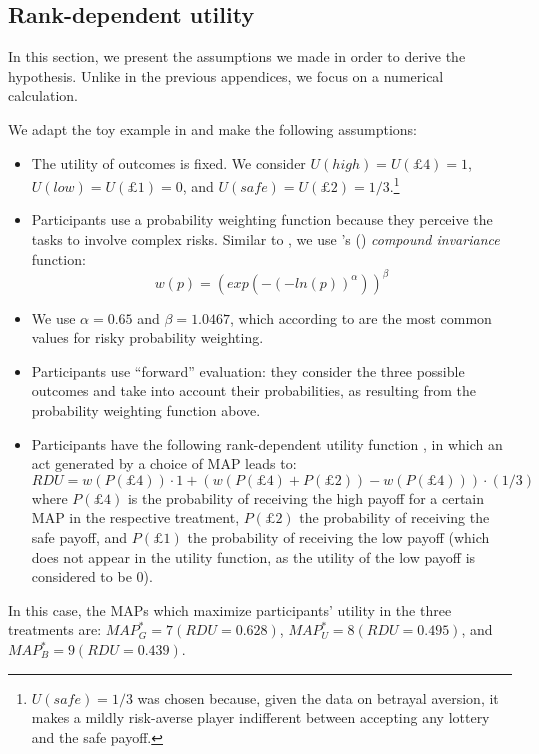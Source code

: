 \documentclass[pdftex,12pt, a4paper]{article}
\begin{document}
\subsection{Rank-dependent utility}
\label{subsec:RDU}

In this section, we present the assumptions we made in order to derive the hypothesis.
Unlike in the previous appendices, we focus on a numerical calculation.

We adapt the toy example in \cite{Li2020a} and make the following assumptions:
\begin{itemize}
\item The utility of outcomes is fixed. We consider $U(high) = U(\pounds4) = 1$, $U(low) = U(\pounds1) = 0$, and $U(safe) = U(\pounds2) = 1/3$.\footnote{
$U(safe)=1/3$ was chosen because, given the data on betrayal aversion, it makes a mildly risk-averse player indifferent between accepting any lottery and the safe payoff.
}
\item Participants use a probability weighting function because they perceive the tasks to involve complex risks. Similar to \cite{Li2020a}, we use \citeauthor{Prelec1998}'s (\citeyear{Prelec1998}) \textit{compound invariance} function:
$$w(p) = (exp(-(-ln(p))^\alpha))^\beta$$ 
\item We use $\alpha = 0.65$ and $\beta = 1.0467$, which according to \cite{Li2020a} are the most common values for risky probability weighting.
\item Participants use ``forward'' evaluation: they consider the three possible outcomes and take into account their probabilities, as resulting from the probability weighting function above.
\item Participants have the following rank-dependent utility function \citep{Schmeidler1989}, in which an act generated by a choice of MAP leads to:
$$RDU = w(P(\pounds4)) \cdot 1 + (w(P(\pounds4) + P(\pounds2)) - w(P(\pounds4))) \cdot (1/3)$$
where $P(\pounds4)$ is the probability of receiving the high payoff for a certain MAP in the respective treatment, $P(\pounds2)$ the probability of receiving the safe payoff, and $P(\pounds1)$ the probability of receiving the low payoff (which does not appear in the utility function, as the utility of the low payoff is considered to be 0).
\end{itemize}

In this case, the MAPs which maximize participants' utility in the three treatments are: $MAP^{*}_G = 7 (RDU = 0.628)$, $MAP^{*}_U = 8 (RDU = 0.495)$, and $MAP^{*}_B = 9 (RDU = 0.439)$.
\end{document}
